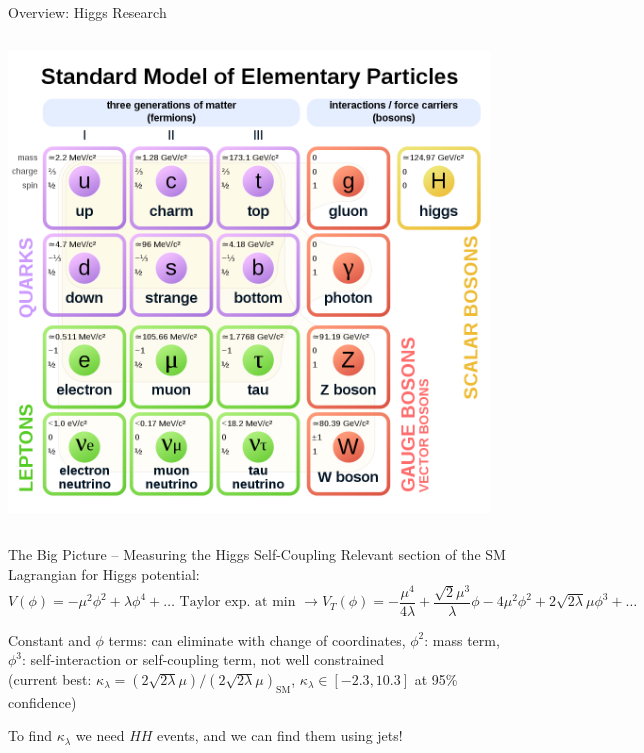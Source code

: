 \documentclass[10pt, aspectratio=169]{beamer}
\begin{document}
{\begin{frame}{Overview: Higgs Research}
\begin{columns}[onlytextwidth]
\begin{column}{0.6\textwidth}
      \includegraphics[width=0.9\linewidth]{images/Standard_Model_of_Elementary_Particles.png}
    \end{column}
​  \end{columns}
\end{frame}
}


\begin{frame}{The Big Picture -- Measuring the Higgs Self-Coupling}
  Relevant section of the SM Lagrangian for Higgs potential:\\
  
  $$V(\phi) = -\mu^2 \phi^2 + \lambda \phi^4 + \ldots \text{ Taylor exp. at min } \to V_T(\phi) = -\frac{\mu^4}{4\lambda} + \frac{\sqrt{2}\mu^3}{\lambda} \phi - 4 \mu^2\phi^2 + 2\sqrt{2\lambda}\mu\phi^3 + \ldots$$
  
  Constant and $\phi$ terms: can eliminate with change of coordinates, $\phi^2$: mass term,\\
  $\phi^3$: self-interaction or \alert{self-coupling} term, not well constrained\\ (current best: $\kappa_\lambda = (2\sqrt{2\lambda}\mu)/(2\sqrt{2\lambda}\mu)_{\text{SM}}$, $\kappa_\lambda \in [-2.3, 10.3]$ at 95\% confidence)

  
  To find $\kappa_\lambda$ we need $HH$ events, and we can find them using jets!
\end{frame}
\end{document}

